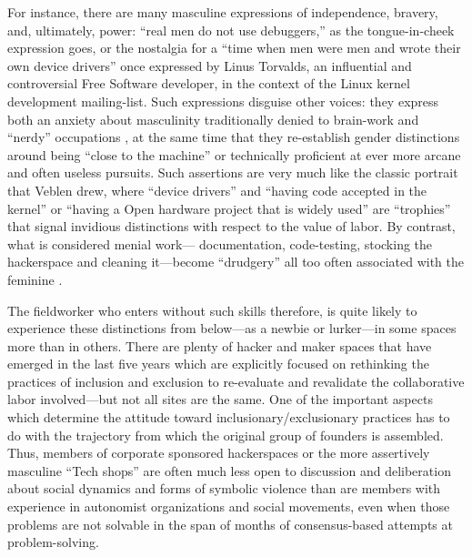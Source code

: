 \documentclass[10pt,letter,oneside]{scrartcl}
\begin{document}
For instance, there are many masculine expressions of independence,
bravery, and, ultimately, power: ``real men do not use debuggers,'' as
the tongue-in-cheek expression goes, or the nostalgia for a ``time when
men were men and wrote their own device drivers'' once expressed by
Linus Torvalds, an influential and controversial Free Software
developer, in the context of the Linux kernel development
mailing-list.  Such expressions disguise other voices: they express
both an anxiety about masculinity traditionally denied to brain-work
and ``nerdy'' occupations \cite{BenjaminNugent}, at the same time that
they re-establish gender distinctions around being ``close to the
machine'' \cite{EllenUllman} or technically proficient at ever more
arcane and often useless pursuits.  Such assertions are very much like
the classic portrait that Veblen drew, where ``device drivers'' and
``having code accepted in the kernel'' or ``having a Open hardware
project that is widely used'' are ``trophies'' that signal invidious
distinctions with respect to the value of labor.  By contrast, what is
considered menial work--- documentation, code-testing, stocking the
hackerspace and cleaning it---become ``drudgery'' all too often
associated with the feminine \cite{Veblen-Leisure}.

The fieldworker who enters without such skills therefore, is quite
likely to experience these distinctions from below---as a newbie or
lurker---in some spaces more than in others.  There are plenty of
hacker and maker spaces that have emerged in the last five years which
are explicitly focused on rethinking the practices of inclusion and
exclusion to re-evaluate and revalidate the collaborative labor
involved---but not all sites are the same. One of the important
aspects which determine the attitude toward inclusionary/exclusionary
practices has to do with the trajectory from which the original group
of founders is assembled. Thus, members of corporate sponsored
hackerspaces or the more assertively masculine ``Tech shops'' are
often much less open to discussion and deliberation about social
dynamics and forms of symbolic violence than are members with
experience in autonomist organizations and social movements, even when
those problems are not solvable in the span of months of
consensus-based attempts at problem-solving.
\end{document}
